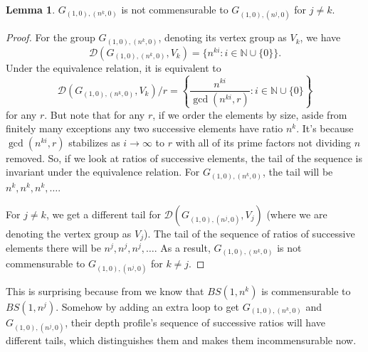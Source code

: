\documentclass[10pt]{article}
\def\naturals{{\mathbb N}}
\def\D{\mathcal{D}}
\theoremstyle{definition}
\newtheorem{lemma}{Lemma}
\begin{document}
\begin{lemma}
    $G_{(1,0),(n^k,0)}$ is not commensurable to $G_{(1,0),(n^j,0)}$ for $j\ne k$. 
\end{lemma}
\begin{proof}
    For the group $G_{(1,0),(n^k,0)}$, denoting its vertex group as $V_k$, we have
$$\D(G_{(1,0),(n^k,0)},V_k) = \{n^{ki}: i\in\naturals \cup \{0\}\}.$$
Under the equivalence relation, it is equivalent to 
$$\D(G_{(1,0),(n^k,0)},V_k)/r = \left\{ \frac{n^{ki}}{\gcd(n^{ki},r)}: i\in \naturals \cup \{0\} \right\}$$ for any $r$. But note that for any $r$, if we order the elements by size, aside from finitely many exceptions any two successive elements have ratio $n^k$. It's because $\gcd(n^{ki},r)$ stabilizes as $i\to\infty$ to $r$ with all of its prime factors not dividing $n$ removed. So, if we look at ratios of successive elements, the tail of the sequence is invariant under the equivalence relation. For $G_{(1,0),(n^k,0)}$, the tail will be $n^k, n^k, n^k,\dots$. 

For $j\ne k$, we get a different tail for $\D(G_{(1,0),(n^j,0)},V_j)$ (where we are denoting the vertex group as $V_j$). The tail of the sequence of ratios of successive elements there will be $n^j, n^j, n^j,\dots$. As a result, $G_{(1,0),(n^k,0)}$ is not commensurable to $G_{(1,0),(n^j,0)}$ for $k\ne j$. 
\end{proof}

\begin{center}
\end{center}

This is surprising because from \cite{CRKZ} we know that $BS(1,n^k)$ is commensurable to $BS(1,n^j)$. Somehow by adding an extra loop to get $G_{(1,0),(n^k,0)}$ and $G_{(1,0),(n^j,0)}$, their depth profile's sequence of successive ratios will have different tails, which distinguishes them and makes them incommensurable now. 
\end{document}
